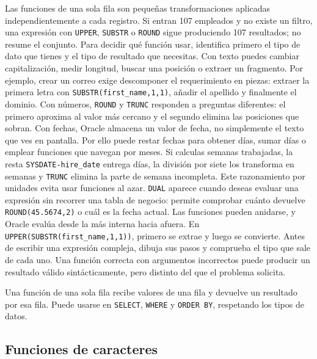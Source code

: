 \documentclass[11pt,a4paper]{article}
\newcommand{\campo}[1]{\texttt{#1}}
\newcommand{\tabla}[1]{\texttt{#1}}
\begin{document}
Las funciones de una sola fila son pequeñas transformaciones aplicadas independientemente a cada
registro. Si entran 107 empleados y no existe un filtro, una expresión con \campo{UPPER},
\campo{SUBSTR} o \campo{ROUND} sigue produciendo 107 resultados; no resume el conjunto. Para decidir
qué función usar, identifica primero el tipo de dato que tienes y el tipo de resultado que necesitas.
Con texto puedes cambiar capitalización, medir longitud, buscar una posición o extraer un fragmento.
Por ejemplo, crear un correo exige descomponer el requerimiento en piezas: extraer la primera letra
con \campo{SUBSTR(first_name,1,1)}, añadir el apellido y finalmente el dominio. Con números,
\campo{ROUND} y \campo{TRUNC} responden a preguntas diferentes: el primero aproxima al valor más
cercano y el segundo elimina las posiciones que sobran. Con fechas, Oracle almacena un valor de fecha,
no simplemente el texto que ves en pantalla. Por ello puede restar fechas para obtener días, sumar
días o emplear funciones que navegan por meses. Si calculas semanas trabajadas, la resta
\campo{SYSDATE-hire_date} entrega días, la división por siete los transforma en semanas y
\campo{TRUNC} elimina la parte de semana incompleta. Este razonamiento por unidades evita usar
funciones al azar. \tabla{DUAL} aparece cuando deseas evaluar una expresión sin recorrer una tabla de
negocio: permite comprobar cuánto devuelve \campo{ROUND(45.5674,2)} o cuál es la fecha actual. Las
funciones pueden anidarse, y Oracle evalúa desde la más interna hacia afuera. En
\campo{UPPER(SUBSTR(first_name,1,1))}, primero se extrae y luego se convierte. Antes de escribir una
expresión compleja, dibuja sus pasos y comprueba el tipo que sale de cada uno. Una función correcta
con argumentos incorrectos puede producir un resultado válido sintácticamente, pero distinto del que
el problema solicita.

Una función de una sola fila recibe valores de una fila y devuelve un resultado por esa fila. Puede
usarse en \campo{SELECT}, \campo{WHERE} y \campo{ORDER BY}, respetando los tipos de datos.

\subsection{Funciones de caracteres}
\end{document}
